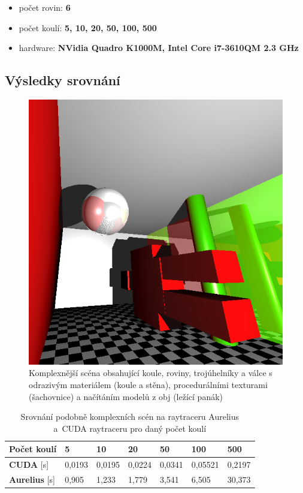 \documentclass[12pt,a4paper,titlepage,final]{report}
\begin{document}
\begin{itemize}
	\item počet rovin: \textbf{6}
	\item počet koulí: \textbf{5, 10, 20, 50, 100, 500}
	\item hardware: \textbf{NVidia Quadro K1000M, Intel Core i7-3610QM 2.3 GHz}
\end{itemize}

\subsection{Výsledky srovnání}

\begin{figure}
\begin{center}
\includegraphics[width=16cm]{images/complex.png}
\caption{Komplexnější scéna obsahující koule, roviny, trojúhelníky a válce s odrazivým materiálem (koule a stěna), procedurálními texturami (šachovnice) a načítáním modelů z obj (ležící panák)}
\end{center}
\end{figure}

\begin{table}
\centering
\begin{tabular}{ | l | l | l | l | l | l | l |}
\hline
\textbf{Počet koulí} & 5  & 10  & 20 & 50 & 100 & 500 \\
\hline
\textbf{CUDA} [s] & 0,0193 & 0,0195 & 0,0224 & 0,0341 & 0,05521 & 0,2197 \\
\hline
\textbf{Aurelius} [s] & 0,905 & 1,233 & 1,779 & 3,541 & 6,505 & 30,373 \\
\hline
\end{tabular}
\caption{Srovnání podobně komplexních scén na raytraceru Aurelius a~CUDA raytraceru pro daný počet koulí}
\end{table}
\end{document}
